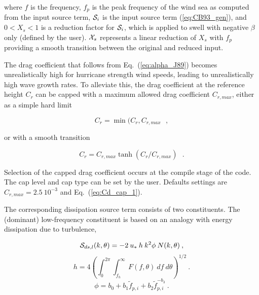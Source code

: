 \noindent
where $f$ is the frequency, $f_p$ is the peak frequency of the wind sea as
computed from the input source term, ${\cal S}_i$ is the input source term
(\ref{eq:CB93_gen}), and $0 < X_s < 1$ is a reduction factor for ${\cal S}_i$,
which is applied to swell with negative $\beta$ only (defined by the
user). ${\cal{X}}_s$ represents a linear reduction of $X_s$ with $f_p$
providing a smooth transition between the original and reduced input.

The drag coefficient that follows from Eq.~(\ref{eq:alpha_J89}) becomes
unrealistically high for hurricane strength wind speeds, leading to
unrealistically high wave growth rates. To alleviate this, the drag
coefficient at the reference height $C_r$ can be capped with a maximum allowed
drag coefficient $C_{r,max}$, either as a simple hard limit

\begin{equation}
C_r = \min ( C_r , C_{r,max} \:\:\: , \label{eq:Cd_cap_1}
\end{equation}

\noindent
or with a smooth transition

\begin{equation}
C_r = C_{r,max} \tanh ( C_r / C_{r,max} ) \:\:\: . \label{eq:Cd_cap_2}
\end{equation}

\noindent
Selection of the capped drag coefficient occurs at the compile stage of the
code. The cap level and cap type can be set by the user. Defaults settings are
$C_{r,max} = 2.5 \:10^{-3}$ and Eq.~(\ref{eq:Cd_cap_1}).

\vspace{\baselineskip}
\noindent
The corresponding dissipation source term consists of two constituents.  The
(dominant) low-frequency constituent is based on an analogy with energy
dissipation due to turbulence,


\begin{equation}
{\cal S}_{ds,l}(k,\theta) = -2 \: u_{\ast} \: h \: k^2 \phi
\: N(k,\theta) \: , \label{eq:TCdl}
\end{equation} \begin{equation}
h = 4\left(\int_{0}^{2\pi} \int_{f_h}^{\infty} \: F(f,\theta) \:
d f \: d\theta \right)^{1/2} \: . \label{eq:h} \end{equation} \begin{equation}
\phi = b_0 + b_1 \tilde{f}_{p,i}  + b_2 \tilde{f}_{p,i} ^{- b_3}
\: . \label{eq:phi} \end{equation}

